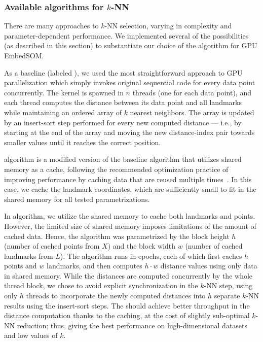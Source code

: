 \subsubsection{Available algorithms for $k$-NN}

There are many approaches to $k$-NN selection, varying in complexity and parameter-dependent performance. We implemented several of the possibilities (as described in this section) to substantiate our choice of the algorithm for GPU EmbedSOM.

As a baseline (labeled ), we used the most straightforward approach to GPU parallelization which simply invokes original sequential code for every data point concurrently.
The  kernel is spawned in $n$ threads (one for each data point), and each thread computes the distance between its data point and all landmarks while maintaining an ordered array of $k$ nearest neighbors.
The array is updated by an insert-sort step performed for every new computed distance --- i.e., by starting at the end of the array and moving the new distance-index pair towards smaller values until it reaches the correct position.

 algorithm is a modified version of the baseline algorithm that utilizes shared memory as a cache, following the recommended optimization practice of improving performance by caching data that are reused multiple times~\cite{guide2013cuda}.
In this case, we cache the landmark coordinates, which are sufficiently small to fit in the shared memory for all tested parametrizations.

In  algorithm, we utilize the shared memory to cache both landmarks and points.
However, the limited size of shared memory imposes limitations of the amount of cached data. Hence, the algorithm was parametrized by the block height $h$ (number of cached points from $X$) and the block width $w$ (number of cached landmarks from $L$).
The algorithm runs in epochs, each of which first caches $h$ points and $w$ landmarks, and then computes $h \cdot w$ distance values using only data in shared memory.
While the distances are computed concurrently by the whole thread block, we chose to avoid explicit synchronization in the $k$-NN step, using only $h$ threads to incorporate the newly computed distances into $h$ separate $k$-NN results using the insert-sort steps.
The  should achieve better throughput in the distance computation thanks to the caching, at the cost of slightly sub-optimal $k$-NN reduction; thus, giving the best performance on high-dimensional datasets and low values of $k$.

